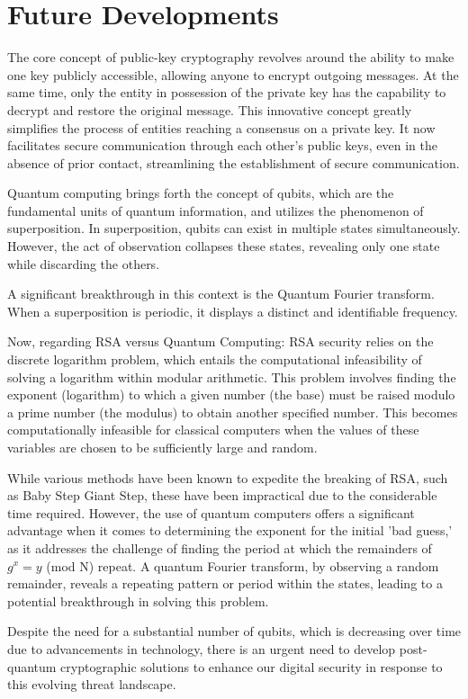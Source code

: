 \chapter{Future Developments}
The core concept of public-key cryptography revolves around the ability to make one key publicly accessible, allowing anyone to encrypt outgoing messages. At the same time, only the entity in possession of the private key has the capability to decrypt and restore the original message. This innovative concept greatly simplifies the process of entities reaching a consensus on a private key. It now facilitates secure communication through each other's public keys, even in the absence of prior contact, streamlining the establishment of secure communication.

Quantum computing brings forth the concept of qubits, which are the fundamental units of quantum information, and utilizes the phenomenon of superposition. In superposition, qubits can exist in multiple states simultaneously. However, the act of observation collapses these states, revealing only one state while discarding the others.

A significant breakthrough in this context is the Quantum Fourier transform. When a superposition is periodic, it displays a distinct and identifiable frequency.

Now, regarding RSA versus Quantum Computing: RSA security relies on the discrete logarithm problem, which entails the computational infeasibility of solving a logarithm within modular arithmetic. This problem involves finding the exponent (logarithm) to which a given number (the base) must be raised modulo a prime number (the modulus) to obtain another specified number. This becomes computationally infeasible for classical computers when the values of these variables are chosen to be sufficiently large and random.

While various methods have been known to expedite the breaking of RSA, such as Baby Step Giant Step, these have been impractical due to the considerable time required. However, the use of quantum computers offers a significant advantage when it comes to determining the exponent for the initial 'bad guess,' as it addresses the challenge of finding the period at which the remainders of $g^x = y$ (mod N) repeat. A quantum Fourier transform, by observing a random remainder, reveals a repeating pattern or period within the states, leading to a potential breakthrough in solving this problem.

Despite the need for a substantial number of qubits, which is decreasing over time due to advancements in technology, there is an urgent need to develop post-quantum cryptographic solutions to enhance our digital security in response to this evolving threat landscape.
